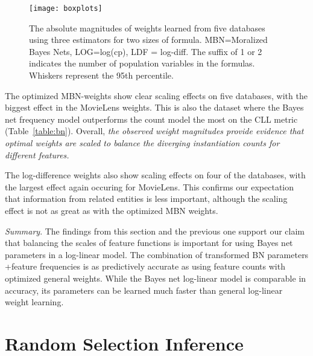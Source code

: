 \documentclass[twoside,11pt]{article}
\newcommand{\point}[1]{\noindent\emph{#1}.}
\begin{document}
\begin{figure}[htbp]
\begin{center}
\texttt{[image: boxplots]}
\caption{The absolute magnitudes of weights learned from five databases using three estimators for two sizes of formula. MBN=Moralized Bayes Nets, LOG=log(cp), LDF = log-diff. The suffix of 1 or 2 indicates the number of population variables in the formulas. Whiskers represent the 95th percentile.}
\label{fig:boxplots}
\end{center}
\end{figure}

The optimized MBN-weights show clear scaling effects on five databases, with the biggest effect in the MovieLens weights. This is also the dataset where the Bayes net frequency model outperforms
the count model the most on the CLL metric (Table~\ref{table:bn}). Overall, {\em the observed weight magnitudes provide evidence that optimal weights are scaled to balance the diverging instantiation counts for different features.} 

The log-difference weights also show scaling effects on four of the databases, with the largest effect again occuring for MovieLens. This confirms our expectation that information from related entities is less important, although the scaling effect is not as great as with the optimized MBN weights. 

\point{Summary} 
The findings from this section and the previous one support our claim that balancing the scales of feature functions is important for using Bayes net parameters in a log-linear model. The combination of  transformed BN parameters +feature frequencies  is as predictively accurate as using feature counts with optimized general weights.
While the Bayes net log-linear model is comparable in accuracy, its parameters can be learned much faster than general log-linear weight learning.
%

 
 


\section{Random Selection Inference} \label{sec:random}
\end{document}
